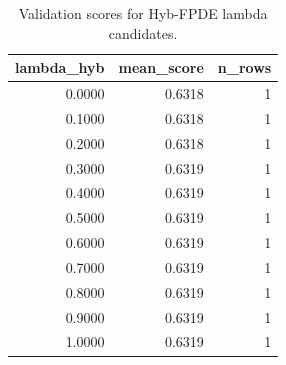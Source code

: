 \begin{table}[t]
\caption{Validation scores for Hyb-FPDE lambda candidates.}
\label{tab:lambda_distribution_computed}
\centering
\begin{tabular}{rrr}
\toprule
lambda\_hyb & mean\_score & n\_rows \\
\midrule
0.0000 & 0.6318 & 1 \\
0.1000 & 0.6318 & 1 \\
0.2000 & 0.6318 & 1 \\
0.3000 & 0.6319 & 1 \\
0.4000 & 0.6319 & 1 \\
0.5000 & 0.6319 & 1 \\
0.6000 & 0.6319 & 1 \\
0.7000 & 0.6319 & 1 \\
0.8000 & 0.6319 & 1 \\
0.9000 & 0.6319 & 1 \\
1.0000 & 0.6319 & 1 \\
\bottomrule
\end{tabular}

\end{table}
